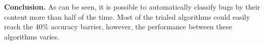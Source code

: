 
{\bf Conclusion.} As can be seen, it is possible to automatically classify bugs by their content more than half of the time. Most of the trialed algorithms could easily reach the 40\% accuracy barrier, however, the performance between these algorithms varies. 



